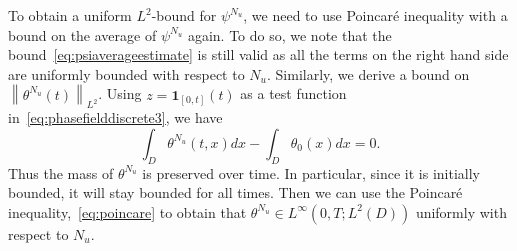 \documentclass[10pt,letterpaper,twoside]{amsart}
\theoremstyle{definition}{\newtheorem{definition}[lemma]{Definition}}
\theoremstyle{note}{\newtheorem{claim}{Claim}[section]
\newtheorem*{claim*}{Claim}}
\numberwithin{equation}{section}
\newcommand{\dom}{D}
\newcommand{\norm}[1]{\left\| #1 \right\|}
\newcommand{\thc}{\theta^{N_u}}
\begin{document}
 To obtain a uniform $L^2$-bound for $\psi^{N_u}$, we need to use Poincar\'e inequality with a bound on the average of $\psi^{N_u}$ again. To do so, we note that the bound~\eqref{eq:psiaverageestimate} is still valid as all the terms on the right hand side are uniformly bounded with respect to $N_u$. Similarly, we derive a bound on $\norm{\thc(t)}_{L^2}$. Using $z=\mathbf{1}_{[0,t]}(t)$ as a test function in~\eqref{eq:phasefielddiscrete3}, we have
 \begin{equation*}
 	\int_{\dom} \thc(t,x)dx -\int_{\dom} \theta_0(x) dx = 0.
 \end{equation*}
 Thus the mass of $\thc$ is preserved over time. In particular, since it is initially bounded, it will stay bounded for all times. Then we can use the Poincar\'e inequality,~\eqref{eq:poincare} to obtain that $\thc\in L^\infty(0,T;L^2(\dom))$ uniformly with respect to $N_u$.
\end{document}
